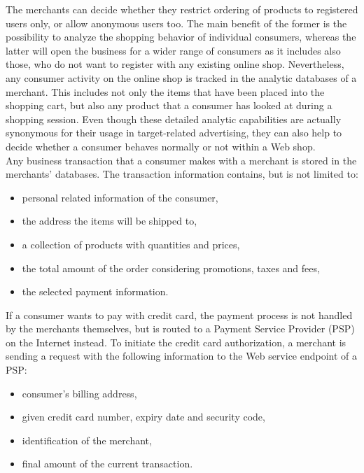 The merchants can decide whether they restrict ordering of products to registered users only, or allow anonymous users too. The main benefit of the former is the possibility to analyze the shopping behavior of individual consumers, whereas the latter will open the business for a wider range of consumers as it includes also those, who do not want to register with any existing online shop. Nevertheless, any consumer activity on the online shop is tracked in the analytic databases of a merchant. This includes not only the items that have been placed into the shopping cart, but also any product that a consumer has looked at during a shopping session. Even though these detailed analytic capabilities are actually synonymous for their usage in target-related advertising, they can also help to decide whether a consumer behaves normally or not within a Web shop. \\

Any business transaction that a consumer makes with a merchant is stored in the merchants' databases. The transaction information contains, but is not limited to:\@

\begin{itemize}
		\item personal related information of the consumer,
		\item the address the items will be shipped to,
		\item a collection of products with quantities and prices,
		\item the total amount of the order considering promotions, taxes and fees,
		\item the selected payment information.
\end{itemize}

If a consumer wants to pay with credit card, the payment process is not handled by the merchants themselves, but is routed to a Payment Service Provider (\gls{PSP}) on the Internet instead. To initiate the credit card authorization, a merchant is sending a request with the following information to the Web service endpoint of a \gls{PSP}: \@

\begin{itemize}
    \item consumer's billing address,
    \item given credit card number, expiry date and security code,
    \item identification of the merchant,
    \item final amount of the current transaction.
\end{itemize}

